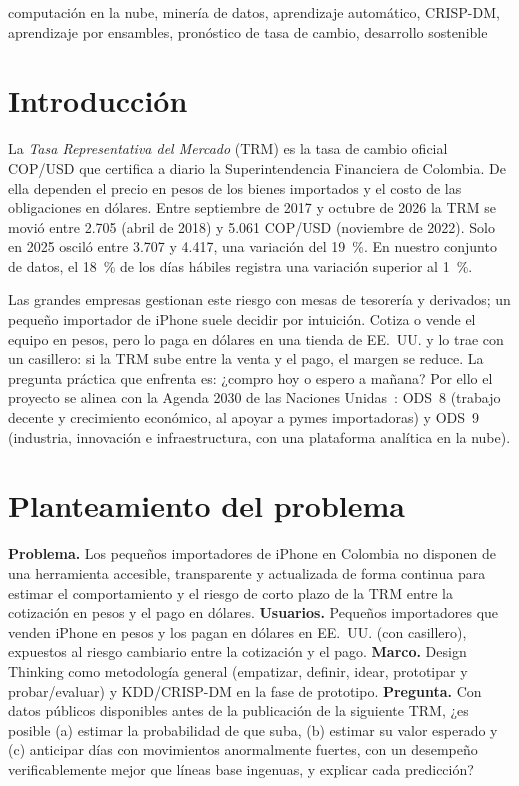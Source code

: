 \documentclass[conference]{IEEEtran}
\begin{document}
\begin{IEEEkeywords}
computación en la nube, minería de datos, aprendizaje automático, CRISP-DM, aprendizaje por ensambles, pronóstico de tasa de cambio, desarrollo sostenible
\end{IEEEkeywords}

\section{Introducción}
La \emph{Tasa Representativa del Mercado} (TRM) es la tasa de cambio oficial COP/USD que certifica a diario la Superintendencia Financiera de Colombia. De ella dependen el precio en pesos de los bienes importados y el costo de las obligaciones en dólares. Entre septiembre de 2017 y octubre de 2026 la TRM se movió entre 2.705 (abril de 2018) y 5.061 COP/USD (noviembre de 2022). Solo en 2025 osciló entre 3.707 y 4.417, una variación del 19~\%. En nuestro conjunto de datos, el 18~\% de los días hábiles registra una variación superior al 1~\%.

Las grandes empresas gestionan este riesgo con mesas de tesorería y derivados; un pequeño importador de iPhone suele decidir por intuición. Cotiza o vende el equipo en pesos, pero lo paga en dólares en una tienda de EE.~UU. y lo trae con un casillero: si la TRM sube entre la venta y el pago, el margen se reduce. La pregunta práctica que enfrenta es: ¿compro hoy o espero a mañana? Por ello el proyecto se alinea con la Agenda 2030 de las Naciones Unidas~\cite{un2015}: ODS~8 (trabajo decente y crecimiento económico, al apoyar a pymes importadoras) y ODS~9 (industria, innovación e infraestructura, con una plataforma analítica en la nube).

\section{Planteamiento del problema}
\textbf{Problema.} Los pequeños importadores de iPhone en Colombia no disponen de una herramienta accesible, transparente y actualizada de forma continua para estimar el comportamiento y el riesgo de corto plazo de la TRM entre la cotización en pesos y el pago en dólares. \textbf{Usuarios.} Pequeños importadores que venden iPhone en pesos y los pagan en dólares en EE.~UU. (con casillero), expuestos al riesgo cambiario entre la cotización y el pago. \textbf{Marco.} Design Thinking como metodología general (empatizar, definir, idear, prototipar y probar/evaluar) y KDD/CRISP-DM en la fase de prototipo. \textbf{Pregunta.} Con datos públicos disponibles antes de la publicación de la siguiente TRM, ¿es posible (a) estimar la probabilidad de que suba, (b) estimar su valor esperado y (c) anticipar días con movimientos anormalmente fuertes, con un desempeño verificablemente mejor que líneas base ingenuas, y explicar cada predicción?
\end{document}
